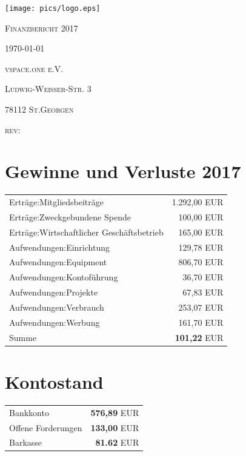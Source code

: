 \documentclass[12pt,a4paper]{article}
\begin{document}
\begin{titlepage}
	\centering
	\texttt{[image: pics/logo.eps]}\par\vspace{1cm}
  {\scshape\Huge Finanzbericht 2017 \par}
	\vfill

	{\scshape\large \today\par}
	{\scshape\large vspace.one e.V. \par}
	{\scshape\large Ludwig-Weißer-Str. 3 \par}
	{\scshape\large 78112 St.Georgen \par}
	{\scshape\large rev: \GITAbrHash \par}
	\vspace{1cm}
\end{titlepage}

\section{Gewinne und Verluste 2017}

\begin{tabular}{ l|r }
  Erträge:Mitgliedsbeiträge & 1.292,00 EUR \\
  Erträge:Zweckgebundene Spende & 100,00 EUR \\
  Erträge:Wirtschaftlicher Geschäftsbetrieb & 165,00 EUR \\
  \hline
  Aufwendungen:Einrichtung & 129,78 EUR \\
  Aufwendungen:Equipment & 806,70 EUR \\
  Aufwendungen:Kontoführung & 36,70 EUR \\
  Aufwendungen:Projekte & 67,83 EUR \\
  Aufwendungen:Verbrauch & 253,07 EUR \\
  Aufwendungen:Werbung & 161,70 EUR \\
  \hline
  Summe & \textbf{101,22} EUR \\

\end{tabular}

\section{Kontostand}
\begin{tabular}{ l|r }
Bankkonto & \textbf{576,89} EUR \\
Offene Forderungen & \textbf{133,00} EUR \\
Barkasse & \textbf{81.62} EUR \\

\end{tabular}
\end{document}
